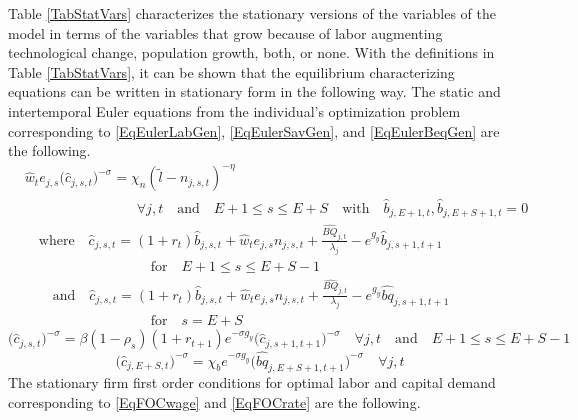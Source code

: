 \documentclass[letterpaper,12pt]{article}
\theoremstyle{definition}
\begin{document}
\begin{spacing}{1.5}
    Table \ref{TabStatVars} characterizes the stationary versions of the variables of the model in terms of the variables that grow because of labor augmenting technological change, population growth, both, or none. With the definitions in Table \ref{TabStatVars}, it can be shown that the equilibrium characterizing equations can be written in stationary form in the following way. The static and intertemporal Euler equations from the individual's optimization problem corresponding to \eqref{EqEulerLabGen}, \eqref{EqEulerSavGen}, and \eqref{EqEulerBeqGen} are the following.
    \begin{equation}\label{EqEulerLabStat}
      \begin{split}
        &\hat{w}_t e_{j,s}\bigl(\hat{c}_{j,s,t}\bigr)^{-\sigma} = \chi_n (\tilde{l} - n_{j,s,t})^{-\eta} \\
        &\quad\quad\quad\quad\quad\quad\quad\quad\forall j,t \quad\text{and}\quad E+1\leq s\leq E+S \quad\text{with}\quad \hat{b}_{j,E+1,t},\hat{b}_{j,E+S+1,t}=0 \\
        &\quad\text{where}\quad \hat{c}_{j,s,t} = \left(1+r_t\right)\hat{b}_{j,s,t} + \hat{w}_t e_{j,s}n_{j,s,t} + \frac{\hat{BQ}_{j,t}}{\lambda_j} - e^{g_y}\hat{b}_{j,s+1,t+1} \\
        &\quad\quad\quad\quad\quad\quad\quad\quad\quad\text{for}\quad E+1\leq s\leq E+S-1 \\
        &\quad\quad\text{and}\quad \hat{c}_{j,s,t} = \left(1+r_t\right)\hat{b}_{j,s,t} + \hat{w}_t e_{j,s}n_{j,s,t} + \frac{\hat{BQ}_{j,t}}{\lambda_j} - e^{g_y}\hat{bq}_{j,s+1,t+1} \\
        &\quad\quad\quad\quad\quad\quad\quad\quad\quad\text{for}\quad s=E+S
      \end{split}
    \end{equation}
    \begin{equation}\label{EqEulerSavStat}
      \bigl(\hat{c}_{j,s,t}\bigr)^{-\sigma} = \beta(1-\rho_s)(1+r_{t+1})e^{-\sigma g_y}\bigl(\hat{c}_{j,s+1,t+1}\bigr)^{-\sigma}\quad\forall j,t \quad\text{and}\quad E+1\leq s\leq E+S-1
    \end{equation}
    \begin{equation}\label{EqEulerBeqStat}
      \bigl(\hat{c}_{j,E+S,t}\bigr)^{-\sigma} = \chi_b e^{-\sigma g_y}\bigl(\hat{bq}_{j,E+S+1,t+1}\bigr)^{-\sigma} \quad\forall j,t
    \end{equation}
    The stationary firm first order conditions for optimal labor and capital demand corresponding to \eqref{EqFOCwage} and \eqref{EqFOCrate} are the following.

\end{spacing}
\end{document}
